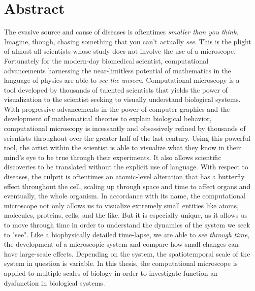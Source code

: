 \documentclass[12pt]{ucsddissertation}
\begin{document}
\section{Abstract}
The evasive source and cause of diseases is oftentimes \textit{smaller than you think}. Imagine, though, chasing something that you can't actually \textit{see}. This is the plight of almost all scientists whose study does not involve the use of a microscope. Fortunately for the modern-day biomedical scientist, computational advancements harnessing the near-limitless potential of mathematics in the language of physics are able to \textit{see the unseen}.
Computational microscopy is a tool developed by thousands of talented scientists that yields the power of visualization to the scientist seeking to visually understand biological systems. With progressive advancements in the power of computer graphics and the development of mathematical theories to explain biological behavior, computational microscopy is incessantly and obsessively refined by thousands of scientists throughout over the greater half of the last century. Using this powerful tool, the artist within the scientist is able to visualize what they know in their mind's eye to be true through their experiments. It also allows scientific discoveries to be translated without the explicit use of language. With respect to diseases, the culprit is oftentimes an atomic-level alteration that has a butterfly effect throughout the cell, scaling up through space and time to affect organs and eventually, the whole organism. In accordance with its name, the computational microscope not only allows us to visualize extremely small entities like atoms, molecules, proteins, cells, and the like. But it is especially unique, as it allows us to move through time in order to understand the dynamics of the system we seek to "see". Like a biophysically detailed time-lapse, we are able to \textit{see through time}, the development of a microscopic system and compare how small changes can have large-scale effects. Depending on the system, the spatiotemporal scale of the system in question is variable. In this thesis, the computational microscope is applied to multiple scales of biology in order to investigate function an dysfunction in biological systems.
\end{document}
